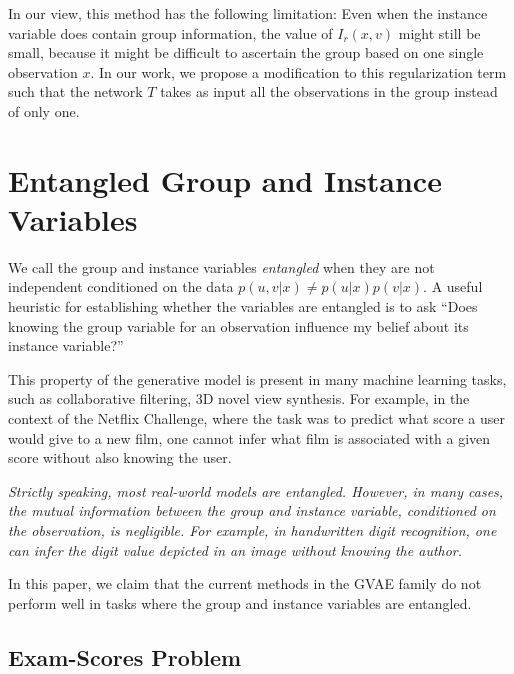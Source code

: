 \documentclass[nohyperref]{article}
\theoremstyle{plain}
\theoremstyle{definition}
\theoremstyle{remark}
\begin{document}
In our view, this method has the following limitation: Even when the instance variable does contain group information, the value of $I_{r} (x, v)$ might still be small, because it might be difficult to ascertain the group based on one single observation $x$. In our work, we propose a modification to this regularization term such that the network $T$ takes as input all the observations in the group instead of only one.

\section{Entangled Group and Instance Variables}

We call the group and instance variables \textit{entangled} when they are not independent conditioned on the data $p(u, v | x) \neq p(u | x) p(v | x)$. A useful heuristic for establishing whether the variables are entangled is to ask ``Does knowing the group variable for an observation influence my belief about its instance variable?''

This property of the generative model is present in many machine learning tasks, such as collaborative filtering, 3D novel view synthesis. For example, in the context of the Netflix Challenge, where the task was to predict what score a user would give to a new film, one cannot infer what film is associated with a given score without also knowing the user.

\textit{Strictly speaking, most real-world models are entangled. However, in many cases, the mutual information between the group and instance variable, conditioned on the observation, is negligible. For example, in handwritten digit recognition, one can infer the digit value depicted in an image without knowing the author.}

In this paper, we claim that the current methods in the GVAE family do not perform well in tasks where the group and instance variables are entangled.

\subsection{Exam-Scores Problem}
\end{document}
